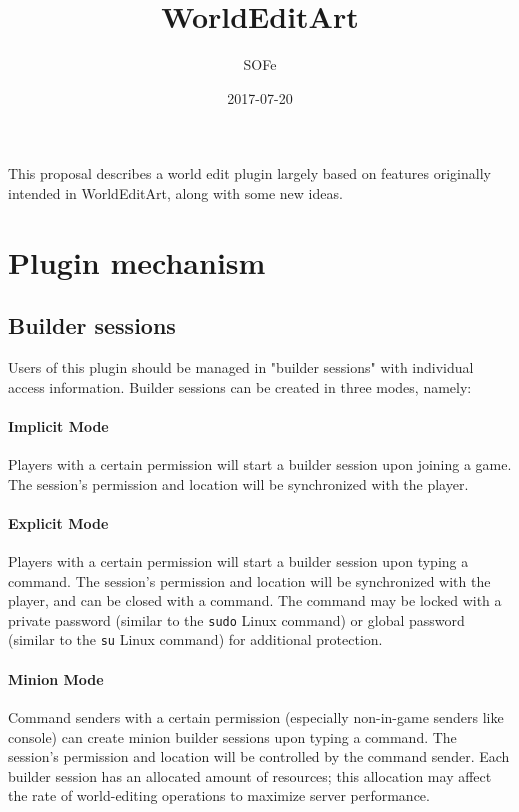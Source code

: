 \documentclass{article}
\title{WorldEditArt}
\date{2017-07-20}
\author{SOFe}
\begin{document}
	\maketitle

	This proposal describes a world edit plugin largely based on features originally intended in WorldEditArt, along with
	some new ideas.

	\section{Plugin mechanism}
		\subsection{Builder sessions}
			Users of this plugin should be managed in "builder sessions" with individual access information. Builder
			sessions can be created in three modes, namely:
			\paragraph{Implicit Mode}
				Players with a certain permission will start a builder session upon joining a game. The session's permission
				and location will be synchronized with the player.
			\paragraph{Explicit Mode}
				Players with a certain permission will start a builder session upon typing a command. The session's
				permission and location will be synchronized with the player, and can be closed with a command. The command
				may be locked with a private password (similar to the \texttt{sudo} Linux command) or global password
				(similar to the \texttt{su} Linux command) for additional protection.
			\paragraph{Minion Mode}
				Command senders with a certain permission (especially non-in-game senders like console) can create minion
				builder sessions upon typing a command. The session's permission and location will be controlled by the
				command sender.
			Each builder session has an allocated amount of resources; this allocation may affect the rate of world-editing
			operations to maximize server performance.
\end{document}
